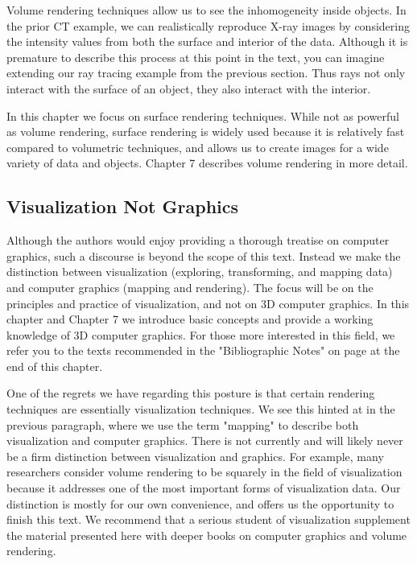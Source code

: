 Volume rendering techniques allow us to see the inhomogeneity inside objects. In the prior CT example, we can realistically reproduce X-ray images by considering the intensity values from both the surface and interior of the data. Although it is premature to describe this process at this point in the text, you can imagine extending our ray tracing example from the previous section. Thus rays not only interact with the surface of an object, they also interact with the interior.

In this chapter we focus on surface rendering techniques. While not as powerful as volume rendering, surface rendering is widely used because it is relatively fast compared to volumetric techniques, and allows us to create images for a wide variety of data and objects. Chapter 7 describes volume rendering in more detail.

\subsection{Visualization Not Graphics}

Although the authors would enjoy providing a thorough treatise on computer graphics, such a discourse is beyond the scope of this text. Instead we make the distinction between visualization (exploring, transforming, and mapping data) and computer graphics (mapping and rendering). The focus will be on the principles and practice of visualization, and not on 3D computer graphics. In this chapter and Chapter 7 we introduce basic concepts and provide a working knowledge of 3D computer graphics. For those more interested in this field, we refer you to the texts recommended in the "Bibliographic Notes" on page \pageref{Ch03BibNotes} at the end of this chapter.

One of the regrets we have regarding this posture is that certain rendering techniques are essentially visualization techniques. We see this hinted at in the previous paragraph, where we use the term "mapping" to describe both visualization and computer graphics. There is not currently and will likely never be a firm distinction between visualization and graphics. For example, many researchers consider volume rendering to be squarely in the field of visualization because it addresses one of the most important forms of visualization data. Our distinction is mostly for our own convenience, and offers us the opportunity to finish this text. We recommend that a serious student of visualization supplement the material presented here with deeper books on computer graphics and volume rendering.

